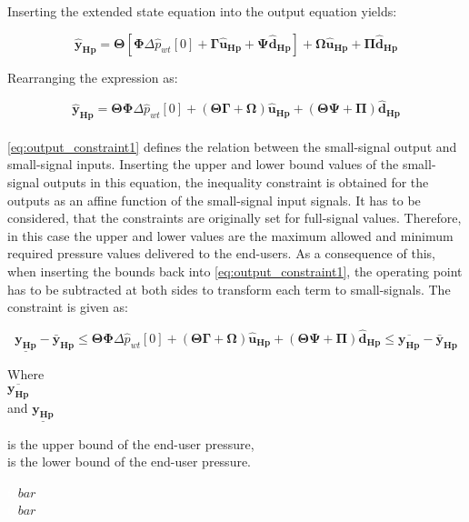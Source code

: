 Inserting the extended state equation into the output equation yields:

\begin{equation}
	\bm{\hat{y}_{Hp}} = \bm{\Theta} [\bm{\Phi} \Delta \hat{p}_{wt}[0] + \bm{\Gamma} \bm{\hat{u}_{Hp}} + \bm{\Psi} \bm{\hat{d}_{Hp}}] + \bm{\Omega} \bm{\hat{u}_{Hp}} + \bm{\Pi} \bm{\hat{d}_{Hp}}
\end{equation}

Rearranging the expression as: 

\begin{equation}
	\bm{\hat{y}_{Hp}} = \bm{\Theta} \bm{\Phi} \Delta \hat{p}_{wt}[0] +  (\bm{\Theta} \bm{\Gamma}+ \bm{\Omega}) \bm{\hat{u}_{Hp}} + (\bm{\Theta} \bm{\Psi} + \bm{\Pi})  \bm{\hat{d}_{Hp}}
	\label{eq:output_constraint1}
\end{equation}
\\
\eqref{eq:output_constraint1} defines the relation between the small-signal output and small-signal inputs. Inserting the upper and lower bound values of the small-signal outputs in this equation, the inequality constraint is obtained for the outputs as an affine function of the small-signal input signals. It has to be considered, that the constraints are originally set for full-signal values. Therefore, in this case the upper and lower values are the maximum allowed and minimum required pressure values delivered to the end-users. As a consequence of this, when inserting the bounds back into \eqref{eq:output_constraint1}, the operating point has to be subtracted at both sides to transform each term to small-signals. The constraint is given as: 

\begin{equation}
	\underline{\bm{y_{Hp}}} - \bm{\bar{y}_{Hp}} \leq \bm{\Theta} \bm{\Phi} \Delta \hat{p}_{wt}[0] +  (\bm{\Theta} \bm{\Gamma}+ \bm{\Omega}) \bm{\hat{u}_{Hp}} + (\bm{\Theta} \bm{\Psi} + \bm{\Pi})  \bm{\hat{d}_{Hp}} \leq \overline{\bm{y_{Hp}}} - \bm{\bar{y}_{Hp}}
	\label{eq:output_constraint2}
\end{equation}

\begin{minipage}[t]{0.20\textwidth}
Where\\
\hspace*{8mm} $ \overline{\bm{y_{Hp}}} $ \\
and \hspace*{0.7mm} $ \underline{\bm{y_{Hp}}} $ 
\end{minipage}
\begin{minipage}[t]{0.68\textwidth}
\vspace*{2mm}
is the upper bound of the end-user pressure, \\
is the lower bound of the end-user pressure. 
\end{minipage}
\begin{minipage}[t]{0.10\textwidth}
\vspace*{1.8mm}
\textcolor{White}{te}$\unit{bar}$\\
\textcolor{White}{te}$\unit{bar}$
\end{minipage}

